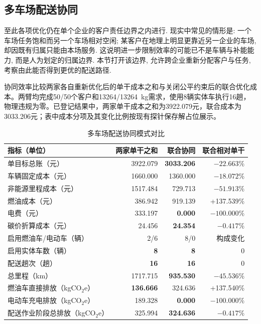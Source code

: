 \documentclass{setp-new}
\begin{document}
\subsection{多车场配送协同}

至此各项优化仍在单个企业的客户责任边界之内进行.
现实中常见的情形是: 一个车场任务饱和而另一个车场相对空闲;
某客户在地理上明显更靠近另一企业的车场, 却因既有归属只能由本场服务.
这说明进一步限制效率的可能已不是车辆与补能能力, 而是人为划定的归属边界.
本节打开该边界, 允许跨企业重新分配客户与任务, 考察由此能否得到更优的配送路径.

协同效率比较两家各自重新优化后的单干成本之和与关闭公平约束后的联合优化成本。两臂均完成50/50个客户和13264/13264~kg需求，使用8辆实体车执行16趟，物理违规为零。已登记结果中，两家单干成本之和为3922.079元，联合成本为3033.206元；表中成本分项及其变化比例按现有探针保存解占位展示。

\begin{table}[htbp]
  \centering
  \caption{多车场配送协同模式对比}
  \label{tab:synergy}
  \scriptsize
  \begin{tabular}{lrrr}
    \toprule
    指标（单位） & 两家单干之和 & 联合协同 & 联合相对单干\\
    \midrule
    单目标总账（元） & 3922.079 & \textbf{3033.206} & $-22.663\%$\\
    车辆固定成本（元） & 1660.000 & 1360.000 & $-18.072\%$\\
    非能源里程成本（元） & 1517.484 & 729.713 & $-51.913\%$\\
    燃油成本（元） & 386.942 & 919.139 & +137.539\%\\
    电费（元） & 333.197 & \textbf{0.000} & $-100.000\%$\\
    碳价折算成本（元） & 24.456 & \textbf{24.354} & $-0.417\%$\\
    启用燃油车/电动车（辆） & 2/6 & 8/0 & 构成变化\\
    启用实体车数（辆） & \textbf{8} & \textbf{8} & 0\\
    配送趟次（趟） & \textbf{16} & \textbf{16} & 0\\
    总里程（km） & 1717.715 & \textbf{935.530} & $-45.536\%$\\
    燃油车直接排放（kgCO$_2$e） & \textbf{136.666} & 324.636 & +137.540\%\\
    电动车充电排放（kgCO$_2$e） & 189.328 & \textbf{0.000} & $-100.000\%$\\
    配送作业阶段总排放（kgCO$_2$e） & 325.994 & \textbf{324.636} & $-0.417\%$\\
    \bottomrule
  \end{tabular}
\end{table}
\end{document}
